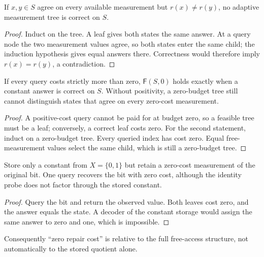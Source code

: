 \begin{theorem}\label{thm:adaptive-no-recovery}
If $x,y\in S$ agree on every available measurement but
$r(x)\ne r(y)$, no adaptive measurement tree is correct on $S$.
\end{theorem}
\begin{proof}
Induct on the tree. A leaf gives both states the same answer. At a
query node the two measurement values agree, so both states enter the
same child; the induction hypothesis gives equal answers there.
Correctness would therefore imply $r(x)=r(y)$, a contradiction.
\end{proof}

\begin{theorem}\label{thm:zero-cost-repair}
If every query costs strictly more than zero, $\mathsf F(S,0)$ holds
exactly when a constant answer is correct on $S$. Without positivity,
a zero-budget tree still cannot distinguish states that agree on every
zero-cost measurement.
\end{theorem}
\begin{proof}
A positive-cost query cannot be paid for at budget zero, so a feasible
tree must be a leaf; conversely, a correct leaf costs zero. For the
second statement, induct on a zero-budget tree. Every queried index
has cost zero. Equal free-measurement values select the same child,
which is still a zero-budget tree.
\end{proof}

\begin{example}
\label{ex:free-query}
Store only a constant from $X=\{0,1\}$ but retain a zero-cost
measurement of the original bit. One query recovers the bit with zero
cost, although the identity probe does not factor through the stored
constant.
\end{example}
\begin{proof}
Query the bit and return the observed value. Both leaves cost zero,
and the answer equals the state. A decoder of the constant storage
would assign the same answer to zero and one, which is impossible.
\end{proof}
Consequently ``zero repair cost'' is relative to the full free-access
structure, not automatically to the stored quotient alone.



